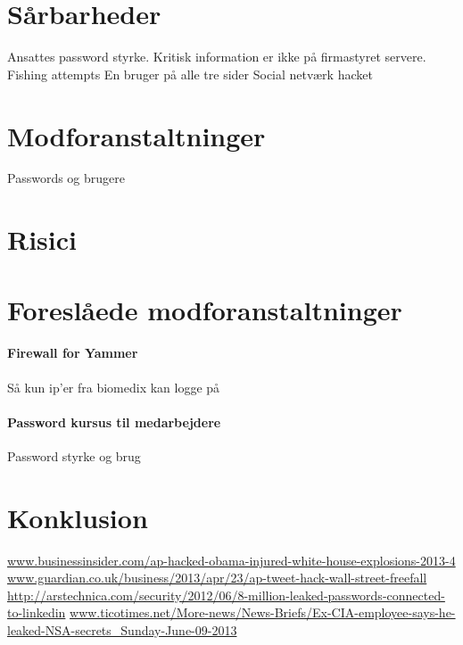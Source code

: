 \documentclass{article}
\begin{document}
\section{Sårbarheder}

Ansattes password styrke.
Kritisk information er ikke på firmastyret servere.
Fishing attempts
En bruger på alle tre sider
Social netværk hacket

\section{Modforanstaltninger}

Passwords og brugere

\section{Risici}

\section{Foreslåede modforanstaltninger}

\paragraph{Firewall for Yammer}
Så kun ip'er fra biomedix kan logge på

\paragraph{Password kursus til medarbejdere}

Password styrke og brug

\section{Konklusion}


\newpage
\begin{thebibliography}{100}


\url{www.businessinsider.com/ap-hacked-obama-injured-white-house-explosions-2013-4}
\url{www.guardian.co.uk/business/2013/apr/23/ap-tweet-hack-wall-street-freefall}
\url{http://arstechnica.com/security/2012/06/8-million-leaked-passwords-connected-to-linkedin}
\url{www.ticotimes.net/More-news/News-Briefs/Ex-CIA-employee-says-he-leaked-NSA-secrets_Sunday-June-09-2013}
\end{thebibliography}
\end{document}
